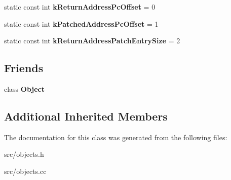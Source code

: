 \begin{DoxyCompactItemize}
\item 
\hypertarget{classv8_1_1internal_1_1_deoptimization_input_data_a6d2e37051bf19fa8716891ea18ba747a}{}static const int {\bfseries k\+Return\+Address\+Pc\+Offset} = 0\label{classv8_1_1internal_1_1_deoptimization_input_data_a6d2e37051bf19fa8716891ea18ba747a}

\item 
\hypertarget{classv8_1_1internal_1_1_deoptimization_input_data_aaf7e72d9574966d80993a30283ae24d7}{}static const int {\bfseries k\+Patched\+Address\+Pc\+Offset} = 1\label{classv8_1_1internal_1_1_deoptimization_input_data_aaf7e72d9574966d80993a30283ae24d7}

\item 
\hypertarget{classv8_1_1internal_1_1_deoptimization_input_data_a18618d0b6823ee692ee99ee778104bf0}{}static const int {\bfseries k\+Return\+Address\+Patch\+Entry\+Size} = 2\label{classv8_1_1internal_1_1_deoptimization_input_data_a18618d0b6823ee692ee99ee778104bf0}

\end{DoxyCompactItemize}
\subsection*{Friends}
\begin{DoxyCompactItemize}
\item 
\hypertarget{classv8_1_1internal_1_1_deoptimization_input_data_a0720b5f434e636e22a3ed34f847eec57}{}class {\bfseries Object}\label{classv8_1_1internal_1_1_deoptimization_input_data_a0720b5f434e636e22a3ed34f847eec57}

\end{DoxyCompactItemize}
\subsection*{Additional Inherited Members}


The documentation for this class was generated from the following files\+:\begin{DoxyCompactItemize}
\item 
src/objects.\+h\item 
src/objects.\+cc\end{DoxyCompactItemize}
